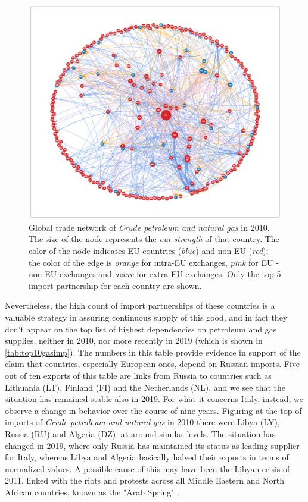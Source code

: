 \begin{figure}
    \centering
    \includegraphics[width=\textwidth]{pics/full_y10_p06_force_120.png}
    \caption[Global trade network of \textit{Crude petroleum and natural gas} in 2010.]{Global trade network of \textit{Crude petroleum and natural gas} in 2010. The size of the node represents the \textit{out-strength} of that country. The color of the node indicates EU countries (\textit{blue}) and non-EU (\textit{red}); the color of the edge is \textit{orange} for intra-EU exchanges, \textit{pink} for EU - non-EU exchanges and \textit{azure} for extra-EU exchanges. Only the top 5 import partnership for each country are shown.}
    \label{fig:gasnetwork}
\end{figure}

Nevertheless, the high count of import partnerships of these countries is a valuable strategy in assuring continuous supply of this good, and in fact they don't appear on the top list of highest dependencies on petroleum and gas supplies, neither in 2010, nor more recently in 2019 (which is shown in \cref{tab:top10gasimp}). The numbers in this table provide evidence in support of the claim that countries, especially European ones, depend on Russian imports. Five out of ten exports of this table are links from Russia to countries such as Lithuania (LT), Finland (FI) and the Netherlands (NL), and we see that the situation has remained stable also in 2019. 
For what it concerns Italy, instead, we observe a change in behavior over the course of nine years. Figuring at the top of imports of \textit{Crude petroleum and natural gas} in 2010 there were Libya (LY), Russia (RU) and Algeria (DZ), at around similar levels. The situation has changed in 2019, where only Russia has maintained its status as leading supplier for Italy, whereas Libya and Algeria basically halved their exports in terms of normalized values. A possible cause of this may have been the Libyan crisis of 2011, linked with the riots and protests across all Middle Eastern and North African countries, known as the "Arab Spring" \cite{wikipedia2011libia}.

